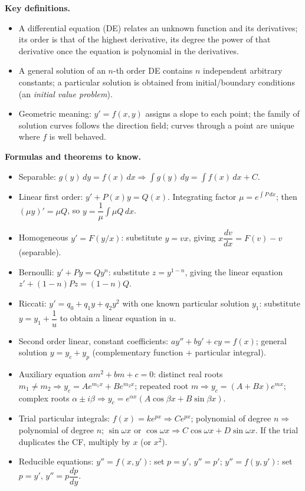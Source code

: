 \documentclass[11pt]{article}
\newcommand{\cle}[1]{{\popxbold\color{popdark}#1}}
\begin{document}
\begin{bilan}
\textbf{Key definitions.}
\begin{itemize}
\item A \cle{differential equation} (DE) relates an unknown function and its derivatives; its \cle{order} is that of the highest derivative, its \cle{degree} the power of that derivative once the equation is polynomial in the derivatives.
\item A \cle{general solution} of an $n$-th order DE contains $n$ independent arbitrary constants; a \cle{particular solution} is obtained from \cle{initial/boundary conditions} (an \emph{initial value problem}).
\item Geometric meaning: $y'=f(x,y)$ assigns a \cle{slope} to each point; the family of \cle{solution curves} follows the \cle{direction field}; curves through a point are unique where $f$ is well behaved.
\end{itemize}

\textbf{Formulas and theorems to know.}
\begin{itemize}
\item \cle{Separable}: $g(y)\,dy=f(x)\,dx \Rightarrow \displaystyle\int g(y)\,dy=\int f(x)\,dx+C$.
\item \cle{Linear first order}: $y'+P(x)y=Q(x)$. Integrating factor $\mu=e^{\int P\,dx}$; then $(\mu y)'=\mu Q$, so $y=\dfrac{1}{\mu}\displaystyle\int \mu Q\,dx$.
\item \cle{Homogeneous} $y'=F(y/x)$: substitute $y=vx$, giving $x\dfrac{dv}{dx}=F(v)-v$ (separable).
\item \cle{Bernoulli}: $y'+Py=Qy^{n}$: substitute $z=y^{1-n}$, giving the linear equation $z'+(1-n)Pz=(1-n)Q$.
\item \cle{Riccati}: $y'=q_0+q_1y+q_2y^{2}$ with one known particular solution $y_1$: substitute $y=y_1+\dfrac{1}{u}$ to obtain a linear equation in $u$.
\item \cle{Second order linear, constant coefficients}: $ay''+by'+cy=f(x)$; general solution $y=y_c+y_p$ (complementary function $+$ particular integral).
\item \cle{Auxiliary equation} $am^{2}+bm+c=0$: distinct real roots $m_1\neq m_2 \Rightarrow y_c=Ae^{m_1x}+Be^{m_2x}$; repeated root $m \Rightarrow y_c=(A+Bx)e^{mx}$; complex roots $\alpha\pm i\beta \Rightarrow y_c=e^{\alpha x}(A\cos\beta x+B\sin\beta x)$.
\item \cle{Trial particular integrals}: $f(x)=ke^{px}\Rightarrow Ce^{px}$; polynomial of degree $n\Rightarrow$ polynomial of degree $n$; $\sin\omega x$ or $\cos\omega x\Rightarrow C\cos\omega x+D\sin\omega x$. If the trial duplicates the CF, multiply by $x$ (or $x^{2}$).
\item \cle{Reducible equations}: $y''=f(x,y')$: set $p=y'$, $y''=p'$; $y''=f(y,y')$: set $p=y'$, $y''=p\dfrac{dp}{dy}$.
\end{itemize}


\end{bilan}
\end{document}
